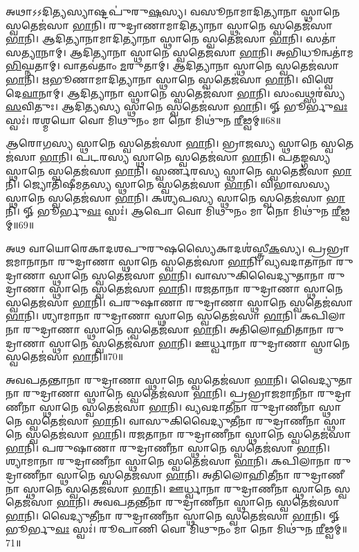 𑌅𑌥𑌾𑌽𑌽𑌦𑌿𑌤𑍍𑌯𑌸𑍍𑌯𑌾𑌷𑍍𑌟𑌪𑍁॑𑌰𑍁\ul{𑌷}𑌸𑍍𑌯। 
𑌵𑌸𑍂𑌨𑌾𑌮𑌾𑌦𑌿𑌤𑍍𑌯𑌾𑌨𑌾 𑌸𑍍𑌥𑌾𑌨𑍇 𑌸𑍍𑌵𑌤𑍇𑌜॑𑌸𑌾 \ul{𑌭𑌾}𑌨𑌿। 
𑌰𑍁𑌦𑍍𑌰𑌾𑌣𑌾𑌮𑌾𑌦𑌿𑌤𑍍𑌯𑌾𑌨𑌾 𑌸𑍍𑌥𑌾𑌨𑍇 𑌸𑍍𑌵𑌤𑍇𑌜॑𑌸𑌾 \ul{𑌭𑌾}𑌨𑌿। 
𑌆𑌦𑌿𑌤𑍍𑌯𑌾𑌨𑌾𑌮𑌾𑌦𑌿\-𑌤𑍍𑌯𑌾𑌨𑌾 𑌸𑍍𑌥𑌾𑌨𑍇 𑌸𑍍𑌵𑌤𑍇𑌜॑𑌸𑌾 \ul{𑌭𑌾}𑌨𑌿। 
𑌸𑌤𑌾॑ 𑌸\ul{𑌤𑍍𑌯𑌾}𑌨𑌾𑌮𑍍‌। 𑌆𑌦𑌿𑌤𑍍𑌯𑌾𑌨𑌾 𑌸𑍍𑌥𑌾𑌨𑍇 𑌸𑍍𑌵𑌤𑍇𑌜॑𑌸𑌾 \ul{𑌭𑌾}𑌨𑌿। 
𑌅𑌭𑌿𑌧𑍂𑌨𑍍𑌵𑌤𑌾॑\-𑌮\ul{𑌭𑌿}𑌘𑍍𑌨𑌤𑌾𑌮𑍍‌। 𑌵𑌾𑌤𑌵॑𑌤𑌾𑌂 \ul{𑌮}𑌰𑍁𑌤𑌾𑌮𑍍‌। 
𑌆𑌦𑌿𑌤𑍍𑌯𑌾𑌨𑌾 𑌸𑍍𑌥𑌾𑌨𑍇 𑌸𑍍𑌵𑌤𑍇𑌜॑𑌸𑌾 \ul{𑌭𑌾}𑌨𑌿। 
𑌋𑌭𑍂𑌣𑌾𑌮𑌾𑌦𑌿𑌤𑍍𑌯𑌾𑌨𑌾 𑌸𑍍𑌥𑌾𑌨𑍇 𑌸𑍍𑌵𑌤𑍇𑌜॑𑌸𑌾 \ul{𑌭𑌾}𑌨𑌿। 
𑌵𑌿𑌶𑍍𑌵𑍇𑌷𑌾𑌂᳚ 𑌦𑍇\ul{𑌵𑌾}𑌨𑌾𑌮𑍍‌। 𑌆𑌦𑌿𑌤𑍍𑌯𑌾𑌨𑌾 𑌸𑍍𑌥𑌾𑌨𑍇 𑌸𑍍𑌵𑌤𑍇𑌜॑𑌸𑌾 \ul{𑌭𑌾}𑌨𑌿। 
𑌸𑌂𑌵𑌥𑍍𑌸𑌰॑𑌸𑍍𑌯 \ul{𑌸}𑌵𑌿𑌤𑍁𑌃। 𑌆𑌦𑌿𑌤𑍍𑌯𑌸𑍍𑌯 𑌸𑍍𑌥𑌾𑌨𑍇 𑌸𑍍𑌵𑌤𑍇𑌜॑𑌸𑌾 \ul{𑌭𑌾}𑌨𑌿। 
𑍐 𑌭𑍂𑌰𑍍𑌭𑍁\ul{𑌵𑌃} 𑌸𑍍𑌵𑌃॑। 𑌰𑌶𑍍𑌮𑌯𑍋 𑌵𑍋 𑌮𑌿𑌥𑍁𑌨𑌂 𑌮𑌾 𑌨𑍋 𑌮𑌿𑌥𑍁॑𑌨 \ul{𑌰𑍀}𑌢𑍍𑌵𑌮𑍍॥68॥\anuvakamend


𑌆𑌰𑍋𑌗𑌸𑍍𑌯 𑌸𑍍𑌥𑌾𑌨𑍇 𑌸𑍍𑌵𑌤𑍇𑌜॑𑌸𑌾 \ul{𑌭𑌾}𑌨𑌿। 𑌭𑍍𑌰𑌾𑌜𑌸𑍍𑌯 𑌸𑍍𑌥𑌾𑌨𑍇 𑌸𑍍𑌵𑌤𑍇𑌜॑𑌸𑌾 \ul{𑌭𑌾}𑌨𑌿। 
𑌪𑌟𑌰𑌸𑍍𑌯 𑌸𑍍𑌥𑌾𑌨𑍇 𑌸𑍍𑌵𑌤𑍇𑌜॑𑌸𑌾 \ul{𑌭𑌾}𑌨𑌿। 𑌪𑌤𑌙𑍍𑌗𑌸𑍍𑌯 𑌸𑍍𑌥𑌾𑌨𑍇 𑌸𑍍𑌵𑌤𑍇𑌜॑𑌸𑌾 \ul{𑌭𑌾}𑌨𑌿। 
𑌸𑍍𑌵𑌰𑍍𑌣𑌰𑌸𑍍𑌯 𑌸𑍍𑌥𑌾𑌨𑍇 𑌸𑍍𑌵𑌤𑍇𑌜॑𑌸𑌾 \ul{𑌭𑌾}𑌨𑌿। 𑌜𑍍𑌯𑍋𑌤𑌿𑌷𑍀𑌮𑌤𑌸𑍍𑌯 𑌸𑍍𑌥𑌾𑌨𑍇 𑌸𑍍𑌵𑌤𑍇𑌜॑𑌸𑌾 \ul{𑌭𑌾}𑌨𑌿। 
𑌵𑌿𑌭𑌾𑌸𑌸𑍍𑌯 𑌸𑍍𑌥𑌾𑌨𑍇 𑌸𑍍𑌵𑌤𑍇𑌜॑𑌸𑌾 \ul{𑌭𑌾}𑌨𑌿। 𑌕𑌶𑍍𑌯𑌪𑌸𑍍𑌯 𑌸𑍍𑌥𑌾𑌨𑍇 𑌸𑍍𑌵𑌤𑍇𑌜॑𑌸𑌾 \ul{𑌭𑌾}𑌨𑌿। 
𑍐 𑌭𑍂𑌰𑍍𑌭𑍁\ul{𑌵𑌃} 𑌸𑍍𑌵𑌃॑। 𑌆𑌪𑍋 𑌵𑍋 𑌮𑌿𑌥𑍁𑌨𑌂 𑌮𑌾 𑌨𑍋 𑌮𑌿𑌥𑍁॑𑌨 \ul{𑌰𑍀}𑌢𑍍𑌵𑌮𑍍॥69॥\anuvakamend


𑌅𑌥 𑌵𑌾𑌯𑍋𑌰𑍇𑌕𑌾𑌦𑌶𑌪𑍁𑌰𑍁𑌷𑌸𑍍𑌯𑍈𑌕𑌾𑌦𑌶॑𑌸𑍍𑌤𑍍𑌰𑍀\ul{𑌕}𑌸𑍍𑌯। 
𑌪𑍍𑌰𑌭𑍍𑌰𑌾𑌜𑌮𑌾𑌨𑌾𑌨𑌾 𑌰𑍁𑌦𑍍𑌰𑌾𑌣𑌾 𑌸𑍍𑌥𑌾𑌨𑍇 𑌸𑍍𑌵𑌤𑍇𑌜॑𑌸𑌾 \ul{𑌭𑌾}𑌨𑌿। 
𑌵𑍍𑌯𑌵𑌦𑌾𑌤𑌾𑌨𑌾 𑌰𑍁𑌦𑍍𑌰𑌾𑌣𑌾 𑌸𑍍𑌥𑌾𑌨𑍇 𑌸𑍍𑌵𑌤𑍇𑌜॑𑌸𑌾 \ul{𑌭𑌾}𑌨𑌿। 
𑌵𑌾𑌸𑍁𑌕𑌿𑌵𑍈𑌦𑍍𑌯𑍁𑌤𑌾𑌨𑌾 𑌰𑍁𑌦𑍍𑌰𑌾𑌣𑌾 𑌸𑍍𑌥𑌾𑌨𑍇 𑌸𑍍𑌵𑌤𑍇𑌜॑𑌸𑌾 \ul{𑌭𑌾}𑌨𑌿। 
𑌰𑌜𑌤𑌾𑌨𑌾 𑌰𑍁𑌦𑍍𑌰𑌾𑌣𑌾 𑌸𑍍𑌥𑌾𑌨𑍇 𑌸𑍍𑌵𑌤𑍇𑌜॑𑌸𑌾 \ul{𑌭𑌾}𑌨𑌿। 
𑌪𑌰𑍁𑌷𑌾𑌣𑌾 𑌰𑍁𑌦𑍍𑌰𑌾𑌣𑌾 𑌸𑍍𑌥𑌾𑌨𑍇 𑌸𑍍𑌵𑌤𑍇𑌜॑𑌸𑌾 \ul{𑌭𑌾}𑌨𑌿। 
𑌶𑍍𑌯𑌾𑌮𑌾𑌨𑌾 𑌰𑍁𑌦𑍍𑌰𑌾𑌣𑌾 𑌸𑍍𑌥𑌾𑌨𑍇 𑌸𑍍𑌵𑌤𑍇𑌜॑𑌸𑌾 \ul{𑌭𑌾}𑌨𑌿। 
𑌕𑌪𑌿𑌲𑌾𑌨𑌾 𑌰𑍁𑌦𑍍𑌰𑌾𑌣𑌾 𑌸𑍍𑌥𑌾𑌨𑍇 𑌸𑍍𑌵𑌤𑍇𑌜॑𑌸𑌾 \ul{𑌭𑌾}𑌨𑌿। 
𑌅𑌤𑌿𑌲𑍋𑌹𑌿𑌤𑌾𑌨𑌾 𑌰𑍁𑌦𑍍𑌰𑌾𑌣𑌾 𑌸𑍍𑌥𑌾𑌨𑍇 𑌸𑍍𑌵𑌤𑍇𑌜॑𑌸𑌾 \ul{𑌭𑌾}𑌨𑌿। 
𑌊𑌰𑍍𑌧𑍍𑌵𑌾𑌨𑌾 𑌰𑍁𑌦𑍍𑌰𑌾𑌣𑌾 𑌸𑍍𑌥𑌾𑌨𑍇 𑌸𑍍𑌵𑌤𑍇𑌜॑𑌸𑌾 \ul{𑌭𑌾}𑌨𑌿॥70॥


𑌅𑌵𑌪𑌤𑌨𑍍𑌤𑌾𑌨𑌾 𑌰𑍁𑌦𑍍𑌰𑌾𑌣𑌾 𑌸𑍍𑌥𑌾𑌨𑍇 𑌸𑍍𑌵𑌤𑍇𑌜॑𑌸𑌾 \ul{𑌭𑌾}𑌨𑌿। 
𑌵𑍈𑌦𑍍𑌯𑍁𑌤𑌾𑌨𑌾 𑌰𑍁𑌦𑍍𑌰𑌾𑌣𑌾 𑌸𑍍𑌥𑌾𑌨𑍇 𑌸𑍍𑌵𑌤𑍇𑌜॑𑌸𑌾 \ul{𑌭𑌾}𑌨𑌿। 
𑌪𑍍𑌰𑌭𑍍𑌰𑌾𑌜𑌮𑌾𑌨𑍀𑌨𑌾 𑌰𑍁𑌦𑍍𑌰𑌾𑌣𑍀𑌨𑌾 𑌸𑍍𑌥𑌾𑌨𑍇 𑌸𑍍𑌵𑌤𑍇𑌜॑𑌸𑌾 \ul{𑌭𑌾}𑌨𑌿। 
𑌵𑍍𑌯𑌵𑌦𑌾𑌤𑍀𑌨𑌾 𑌰𑍁𑌦𑍍𑌰𑌾𑌣𑍀𑌨𑌾 𑌸𑍍𑌥𑌾𑌨𑍇 𑌸𑍍𑌵𑌤𑍇𑌜॑𑌸𑌾 \ul{𑌭𑌾}𑌨𑌿। 
𑌵𑌾𑌸𑍁𑌕𑌿𑌵𑍈𑌦𑍍𑌯𑍁𑌤𑍀𑌨𑌾 𑌰𑍁𑌦𑍍𑌰𑌾𑌣𑍀𑌨𑌾 𑌸𑍍𑌥𑌾𑌨𑍇 𑌸𑍍𑌵𑌤𑍇𑌜॑𑌸𑌾 \ul{𑌭𑌾}𑌨𑌿। 
𑌰𑌜𑌤𑌾𑌨𑌾 𑌰𑍁𑌦𑍍𑌰𑌾𑌣𑍀𑌨𑌾 𑌸𑍍𑌥𑌾𑌨𑍇 𑌸𑍍𑌵𑌤𑍇𑌜॑𑌸𑌾 \ul{𑌭𑌾}𑌨𑌿। 
𑌪𑌰𑍁𑌷𑌾𑌣𑌾 𑌰𑍁𑌦𑍍𑌰𑌾𑌣𑍀𑌨𑌾 𑌸𑍍𑌥𑌾𑌨𑍇 𑌸𑍍𑌵𑌤𑍇𑌜॑𑌸𑌾 \ul{𑌭𑌾}𑌨𑌿। 
𑌶𑍍𑌯𑌾𑌮𑌾𑌨𑌾 𑌰𑍁𑌦𑍍𑌰𑌾𑌣𑍀𑌨𑌾 𑌸𑍍𑌥𑌾𑌨𑍇 𑌸𑍍𑌵𑌤𑍇𑌜॑𑌸𑌾 \ul{𑌭𑌾}𑌨𑌿। 
𑌕𑌪𑌿𑌲𑌾𑌨𑌾 𑌰𑍁𑌦𑍍𑌰𑌾𑌣𑍀𑌨𑌾 𑌸𑍍𑌥𑌾𑌨𑍇 𑌸𑍍𑌵𑌤𑍇𑌜॑𑌸𑌾 \ul{𑌭𑌾}𑌨𑌿। 
𑌅𑌤𑌿𑌲𑍋𑌹𑌿𑌤𑍀𑌨𑌾 𑌰𑍁𑌦𑍍𑌰𑌾𑌣𑍀𑌨𑌾 𑌸𑍍𑌥𑌾𑌨𑍇 𑌸𑍍𑌵𑌤𑍇𑌜॑𑌸𑌾 \ul{𑌭𑌾}𑌨𑌿। 
𑌊𑌰𑍍𑌧𑍍𑌵𑌾𑌨𑌾 𑌰𑍁𑌦𑍍𑌰𑌾𑌣𑍀𑌨𑌾 𑌸𑍍𑌥𑌾𑌨𑍇 𑌸𑍍𑌵𑌤𑍇𑌜॑𑌸𑌾 \ul{𑌭𑌾}𑌨𑌿। 
𑌅𑌵𑌪𑌤𑌨𑍍𑌤𑍀𑌨𑌾 𑌰𑍁𑌦𑍍𑌰𑌾𑌣𑍀𑌨𑌾 𑌸𑍍𑌥𑌾𑌨𑍇 𑌸𑍍𑌵𑌤𑍇𑌜॑𑌸𑌾 \ul{𑌭𑌾}𑌨𑌿। 
𑌵𑍈𑌦𑍍𑌯𑍁𑌤𑍀𑌨𑌾 𑌰𑍁𑌦𑍍𑌰𑌾𑌣𑍀𑌨𑌾 𑌸𑍍𑌥𑌾𑌨𑍇 𑌸𑍍𑌵𑌤𑍇𑌜॑𑌸𑌾 \ul{𑌭𑌾}𑌨𑌿। 
𑍐 𑌭𑍂𑌰𑍍𑌭𑍁\ul{𑌵𑌃} 𑌸𑍍𑌵𑌃॑। 𑌰𑍂𑌪𑌾𑌣𑌿 𑌵𑍋 𑌮𑌿𑌥𑍁𑌨𑌂 𑌮𑌾 𑌨𑍋 𑌮𑌿𑌥𑍁॑𑌨 \ul{𑌰𑍀}𑌢𑍍𑌵𑌮𑍍॥71॥\anuvakamend


